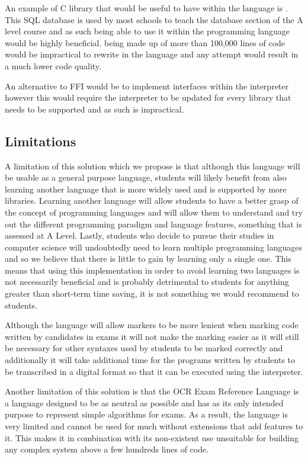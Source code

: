 \documentclass{article}
\begin{document}
An example of C library that would be useful to have within the language is
. This SQL database is used by most schools to teach the
database section of the A level course and as such being able to use it within
the programming language would be highly beneficial.  being
made up of more than 100,000 lines of code would be impractical to rewrite in
the language and any attempt would result in a much lower code quality.

An alternative to FFI would be to implement interfaces within the interpreter
however this would require the interpreter to be updated for every library that
needs to be supported and as such is impractical.

\subsection{Limitations}


A limitation of this solution which we propose is that although this language
will be usable as a general purpose language, students will likely benefit from
also learning another language that is more widely used and is supported by
more libraries. Learning another language will allow students to have a better
grasp of the concept of programming languages and will allow them to understand
and try out the different programming paradigm and language features, something
that is assessed at A Level. Lastly, students who decide to pursue their
studies in computer science will undoubtedly need to learn multiple programming
languages and so we believe that there is little to gain by learning only a
single one. This means that using this implementation in order to avoid
learning two languages is not necessarily beneficial and is probably
detrimental to students for anything greater than short-term time saving, it is
not something we would recommend to students.

Although the language will allow markers to be more lenient when marking code
written by candidates in exams it will not make the marking easier as it will
still be necessary for other syntaxes used by students to be marked correctly
and additionally it will take additional time for the programs written by
students to be transcribed in a digital format so that it can be executed using
the interpreter.

Another limitation of this solution is that the OCR Exam Reference Language is
a language designed to be as neutral as possible and has as its only intended
purpose to represent simple algorithms for exams. As a result, the language is
very limited and cannot be used for much without extensions that add features
to it. This makes it in combination with its non-existent use unsuitable for
building any complex system above a few hundreds lines of code.
\end{document}
